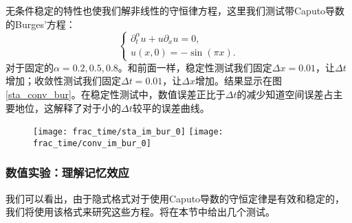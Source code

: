 无条件稳定的特性也使我们解非线性的守恒律方程，这里我们测试带Caputo导数的Burges'方程：
\begin{equation}\label{eq_burgers}
\begin{cases}
\partial^\alpha_t u + u\partial_x u = 0, \\
u(x, 0) = -\sin(\pi x).
\end{cases}
\end{equation}
对于固定的$\alpha = 0.2, 0.5, 0.8$。和前面一样，稳定性测试我们固定$\Delta x=0.01$，让$\Delta t$增加；收敛性测试我们固定$\Delta t=0.01$，让$\Delta x$增加。结果显示在图\ref{sta_conv_bur}。在稳定性测试中，数值误差正比于$\Delta t$的减少知道空间误差占主要地位，这解释了对于小的$\Delta t$较平的误差曲线。
 
\begin{figure}[htbp]
	\texttt{[image: frac\_time/sta\_im\_bur\_0]}
	\texttt{[image: frac\_time/conv\_im\_bur\_0]}
\end{figure}

\subsubsection{数值实验：理解记忆效应}
我们可以看出，由于隐式格式对于使用Caputo导数的守恒定律是有效和稳定的，我们将使用该格式来研究这些方程。将在本节中给出几个测试。

